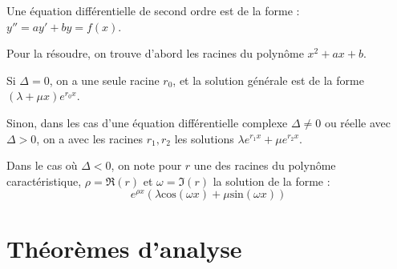 \documentclass[a4paper,12pt]{book}
\begin{document}
\begin{tcolorbox}[colback=white,colframe=black,title=Résolution d'équations différentielles du second ordre] 
Une équation différentielle de second ordre est de la forme : $y'' = ay' + by = f(x)$.
\par Pour la résoudre, on trouve d'abord les racines du polynôme $x^2 + ax + b$.
\par Si $\Delta=0$, on a une seule racine $r_0$, et la solution générale est de la forme $(\lambda + \mu x)e^{r_0 x}$.
\par Sinon, dans les cas d'une équation différentielle complexe $\Delta\neq0$ ou réelle avec $\Delta>0$, on a avec les racines $r_1,r_2$ les solutions $\lambda e^{r_1x} + \mu e^{r_2x}$.
\par Dans le cas où $\Delta<0$, on note pour $r$ une des racines du polynôme caractéristique, $\rho = \Re(r)$ et $\omega = \Im(r)$ la solution de la forme :
$$e^{\rho x} (\lambda \mathrm{cos}(\omega x) + \mu \mathrm{sin}(\omega x))$$
\end{tcolorbox}


\newpage
\section{Théorèmes d'analyse}
\end{document}
